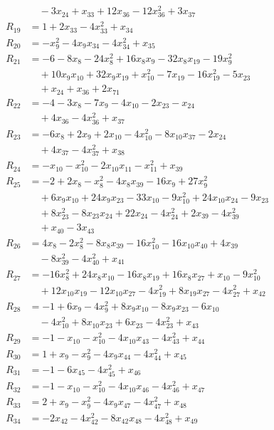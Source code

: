 \begin{align*}
&\quad{}-3x_{24}+x_{33}+12x_{36}-12x_{36}^{2}+3x_{37}\\
R_{19}&=1+2x_{33}-4x_{33}^{2}+x_{34}\\
R_{20}&=-x_{9}^{2}-4x_{9}x_{34}-4x_{34}^{2}+x_{35}\\
R_{21}&=-6-8x_{8}-24x_{8}^{2}+16x_{8}x_{9}-32x_{8}x_{19}-19x_{9}^{2}\\
&\quad{}+10x_{9}x_{10}+32x_{9}x_{19}+x_{10}^{2}-7x_{19}-16x_{19}^{2}-5x_{23}\\
&\quad{}+x_{24}+x_{36}+2x_{71}\\
R_{22}&=-4-3x_{8}-7x_{9}-4x_{10}-2x_{23}-x_{24}\\
&\quad{}+4x_{36}-4x_{36}^{2}+x_{37}\\
R_{23}&=-6x_{8}+2x_{9}+2x_{10}-4x_{10}^{2}-8x_{10}x_{37}-2x_{24}\\
&\quad{}+4x_{37}-4x_{37}^{2}+x_{38}\\
R_{24}&=-x_{10}-x_{10}^{2}-2x_{10}x_{11}-x_{11}^{2}+x_{39}\\
R_{25}&=-2+2x_{8}-x_{8}^{2}-4x_{8}x_{39}-16x_{9}+27x_{9}^{2}\\
&\quad{}+6x_{9}x_{10}+24x_{9}x_{23}-33x_{10}-9x_{10}^{2}+24x_{10}x_{24}-9x_{23}\\
&\quad{}+8x_{23}^{2}-8x_{23}x_{24}+22x_{24}-4x_{24}^{2}+2x_{39}-4x_{39}^{2}\\
&\quad{}+x_{40}-3x_{43}\\
R_{26}&=4x_{8}-2x_{8}^{2}-8x_{8}x_{39}-16x_{10}^{2}-16x_{10}x_{40}+4x_{39}\\
&\quad{}-8x_{39}^{2}-4x_{40}^{2}+x_{41}\\
R_{27}&=-16x_{8}^{2}+24x_{8}x_{10}-16x_{8}x_{19}+16x_{8}x_{27}+x_{10}-9x_{10}^{2}\\
&\quad{}+12x_{10}x_{19}-12x_{10}x_{27}-4x_{19}^{2}+8x_{19}x_{27}-4x_{27}^{2}+x_{42}\\
R_{28}&=-1+6x_{9}-4x_{9}^{2}+8x_{9}x_{10}-8x_{9}x_{23}-6x_{10}\\
&\quad{}-4x_{10}^{2}+8x_{10}x_{23}+6x_{23}-4x_{23}^{2}+x_{43}\\
R_{29}&=-1-x_{10}-x_{10}^{2}-4x_{10}x_{43}-4x_{43}^{2}+x_{44}\\
R_{30}&=1+x_{9}-x_{9}^{2}-4x_{9}x_{44}-4x_{44}^{2}+x_{45}\\
R_{31}&=-1-6x_{45}-4x_{45}^{2}+x_{46}\\
R_{32}&=-1-x_{10}-x_{10}^{2}-4x_{10}x_{46}-4x_{46}^{2}+x_{47}\\
R_{33}&=2+x_{9}-x_{9}^{2}-4x_{9}x_{47}-4x_{47}^{2}+x_{48}\\
R_{34}&=-2x_{42}-4x_{42}^{2}-8x_{42}x_{48}-4x_{48}^{2}+x_{49}\\

\end{align*}
